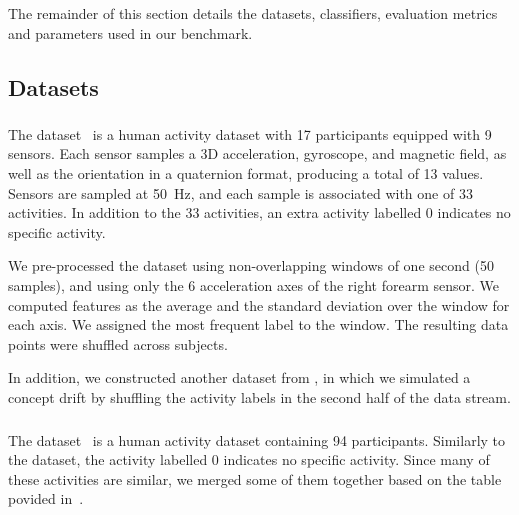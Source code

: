 
The remainder of this section details the datasets, classifiers,
evaluation metrics and parameters used in our benchmark.

\subsection{Datasets}
\subsubsection{\banosdataset}
The \banosdataset dataset~\cite{Banos_2014} is a
human activity dataset with 17 participants
equipped with 9 sensors. Each sensor samples a 3D
acceleration, gyroscope, and magnetic field, as
well as the orientation in a quaternion format,
producing a total of 13 values.  Sensors are
sampled at 50~Hz, and each sample is associated
with one of 33 activities. In addition to the 33
activities, an extra activity labelled 0 indicates
no specific activity.

We pre-processed the \banosdataset dataset using
non-overlapping windows of one second (50
samples), and using only the 6 acceleration axes
of the right forearm sensor. We computed features
as the average and the standard deviation over the
window for each axis. We assigned the most
frequent label to the window.  The resulting data
points were shuffled across subjects.

In addition, we constructed another dataset from \banosdataset, in which we
simulated a concept drift by shuffling the activity labels in the
second half of the data stream. 

\subsubsection{\recofitdataset}
The \recofitdataset dataset~\cite{recofit} is a
human activity dataset containing 94
participants. Similarly to the \banosdataset
dataset, the activity labelled 0 indicates no
specific activity.
Since many of these activities are similar, we
merged some of them together based on the table
povided in~\cite{behzad2019}. 

